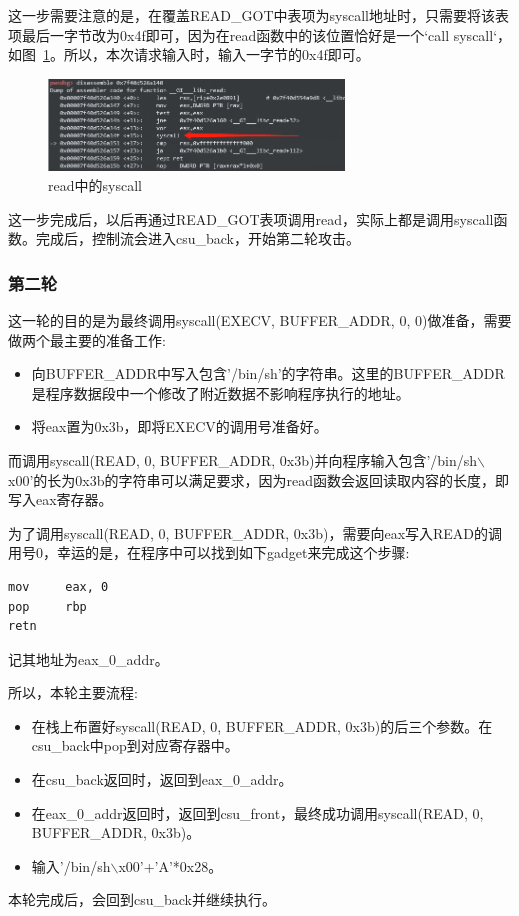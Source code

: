 这一步需要注意的是，在覆盖READ\_GOT中表项为syscall地址时，只需要将该表项最后一字节改为0x4f即可，因为在read函数中的该位置恰好是一个`call syscall`，如图~\ref{fig:6}。所以，本次请求输入时，输入一字节的0x4f即可。
\begin{figure}[H]
    \centering
    \includegraphics[width=0.7\textwidth]{WP/pwn/pic/6.jpg}
    \caption{read中的syscall}
    \label{fig:6}
\end{figure}

这一步完成后，以后再通过READ\_GOT表项调用read，实际上都是调用syscall函数。完成后，控制流会进入csu\_back，开始第二轮攻击。

\subsubsection*{第二轮}
这一轮的目的是为最终调用syscall(EXECV, BUFFER\_ADDR, 0, 0)做准备，需要做两个最主要的准备工作:
\begin{itemize}
    \item 向BUFFER\_ADDR中写入包含'/bin/sh'的字符串。这里的BUFFER\_ADDR是程序数据段中一个修改了附近数据不影响程序执行的地址。
    \item 将eax置为0x3b，即将EXECV的调用号准备好。
\end{itemize}

而调用syscall(READ, 0, BUFFER\_ADDR, 0x3b)并向程序输入包含'/bin/sh$\backslash$x00'的长为0x3b的字符串可以满足要求，因为read函数会返回读取内容的长度，即写入eax寄存器。

为了调用syscall(READ, 0, BUFFER\_ADDR, 0x3b)，需要向eax写入READ的调用号0，幸运的是，在程序中可以找到如下gadget来完成这个步骤:
\begin{lstlisting}
mov     eax, 0
pop     rbp
retn
\end{lstlisting}
记其地址为eax\_0\_addr。

所以，本轮主要流程:
\begin{itemize}
    \item 在栈上布置好syscall(READ, 0, BUFFER\_ADDR, 0x3b)的后三个参数。在csu\_back中pop到对应寄存器中。
    \item 在csu\_back返回时，返回到eax\_0\_addr。
    \item 在eax\_0\_addr返回时，返回到csu\_front，最终成功调用syscall(READ, 0, BUFFER\_ADDR, 0x3b)。
    \item 输入'/bin/sh$\backslash$x00'+'A'*0x28。
\end{itemize}
本轮完成后，会回到csu\_back并继续执行。

